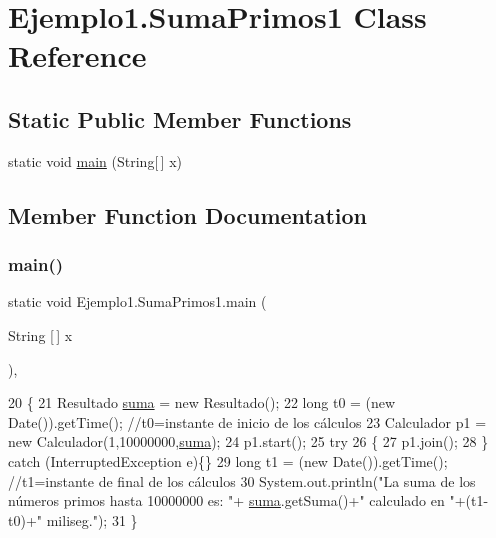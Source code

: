 \hypertarget{class_ejemplo1_1_1_suma_primos1}{}\section{Ejemplo1.\+Suma\+Primos1 Class Reference}
\label{class_ejemplo1_1_1_suma_primos1}
\subsection*{Static Public Member Functions}
\begin{DoxyCompactItemize}
\item 
static void \mbox{\hyperlink{class_ejemplo1_1_1_suma_primos1_a561553bc8f22335b5e41ca75b0518305}{main}} (String\mbox{[}$\,$\mbox{]} x)
\end{DoxyCompactItemize}


\subsection{Member Function Documentation}
\mbox{\label{class_ejemplo1_1_1_suma_primos1_a561553bc8f22335b5e41ca75b0518305}} 
\subsubsection{\texorpdfstring{main()}{main()}}
{\footnotesize\ttfamily static void Ejemplo1.\+Suma\+Primos1.\+main (\begin{DoxyParamCaption}\item[{String \mbox{[}$\,$\mbox{]}}]{x }\end{DoxyParamCaption})\hspace{0.3cm}{\ttfamily [inline]}, {\ttfamily [static]}}


\begin{DoxyCode}
20     \{       
21         Resultado \mbox{\hyperlink{namespacesuma}{suma}} = \textcolor{keyword}{new} Resultado();
22         \textcolor{keywordtype}{long} t0 = (\textcolor{keyword}{new} Date()).getTime(); \textcolor{comment}{//t0=instante de inicio de los cálculos}
23         Calculador p1 = \textcolor{keyword}{new} Calculador(1,10000000,\mbox{\hyperlink{namespacesuma}{suma}});
24         p1.start();
25         \textcolor{keywordflow}{try}
26         \{
27             p1.join();
28         \} \textcolor{keywordflow}{catch} (InterruptedException e)\{\}
29         \textcolor{keywordtype}{long} t1 = (\textcolor{keyword}{new} Date()).getTime(); \textcolor{comment}{//t1=instante de final de los cálculos}
30         System.out.println(\textcolor{stringliteral}{"La suma de los números primos hasta 10000000 es: "}+
      \mbox{\hyperlink{namespacesuma}{suma}}.getSuma()+\textcolor{stringliteral}{" calculado en "}+(t1-t0)+\textcolor{stringliteral}{" miliseg."});
31     \}
\end{DoxyCode}
